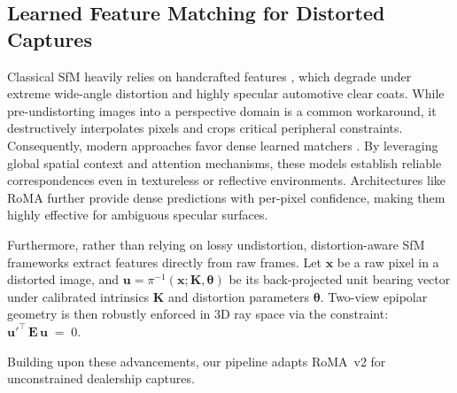 \documentclass[letterpaper, 10 pt, conference]{ieeeconf}  %
\begin{document}






\subsection{Learned Feature Matching for Distorted Captures}
\label{subsec:related_work_learned_feature_matching_for_wide_fov_and_distorted_captures}

Classical SfM heavily relies on handcrafted features \cite{lowe2004distinctive, rublee2011orb}, which degrade under extreme wide-angle distortion and highly specular automotive clear coats. While pre-undistorting images into a perspective domain is a common workaround, it destructively interpolates pixels and crops critical peripheral constraints. Consequently, modern approaches favor dense learned matchers \cite{sun2021loftr}. By leveraging global spatial context and attention mechanisms, these models establish reliable correspondences even in textureless or reflective environments. Architectures like RoMA \cite{edstedt2024roma} further provide dense predictions with per-pixel confidence, making them highly effective for ambiguous specular surfaces.

Furthermore, rather than relying on lossy undistortion, distortion-aware SfM frameworks extract features directly from raw frames. Let $\mathbf{x}$ be a raw pixel in a distorted image, and $\mathbf{u}=\pi^{-1}(\mathbf{x};\mathbf{K},\boldsymbol{\theta})$ be its back-projected unit bearing vector under calibrated intrinsics $\mathbf{K}$ and distortion parameters $\boldsymbol{\theta}$. Two-view epipolar geometry is then robustly enforced in 3D ray space via the constraint: $\mathbf{u}'^{\top}\,\mathbf{E}\,\mathbf{u} \;=\; 0
    \label{eq:essential_bearing}$. 
    
Building upon these advancements, our pipeline adapts RoMA~v2 \cite{edstedt2025roma} for unconstrained dealership captures. 

\end{document}
